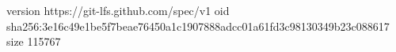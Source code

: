 version https://git-lfs.github.com/spec/v1
oid sha256:3e16c49e1be5f7beae76450a1c1907888adcc01a61fd3c98130349b23c088617
size 115767
